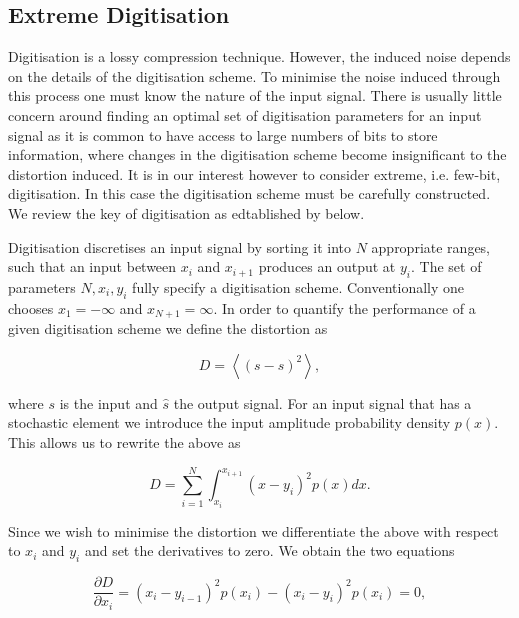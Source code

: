 \documentclass[apj]{emulateapj}
\begin{document}
\subsection{Extreme Digitisation}
\label{subsec:extremedigitisation}

Digitisation is a lossy compression technique. However, the induced noise depends on the details of the digitisation scheme. To minimise the noise induced through this process one must know the nature of the input signal. There is usually little concern around finding an optimal set of digitisation parameters for an input signal as it is common to have access to large numbers of bits to store information, where changes in the digitisation scheme become insignificant to the distortion induced. It is in our interest however to consider extreme, i.e. few-bit, digitisation. In this case the digitisation scheme must be carefully constructed. We review the key of digitisation as edtablished by \cite{max1960} below.

Digitisation discretises an input signal by sorting it into $N$ appropriate ranges, such that an input between $x_i$ and $x_{i+1}$ produces an output at $y_i$. The set of parameters $N, x_i, y_i$ fully specify a digitisation scheme. Conventionally one chooses $x_{1} = -\infty$ and $x_{N+1} = \infty$. In order to quantify the performance of a given digitisation scheme we define the distortion as

\begin{equation} D = \left\langle  \left( s - \hat{s} \right)^2 \right\rangle, \end{equation}

where $s$ is the input and $\hat{s}$ the output signal. For an input signal that has a stochastic element we introduce the input amplitude probability density $p(x)$. This allows us to rewrite the above as

\begin{equation} D = \sum_{i = 1}^N \int_{x_i}^{x_{i+1}} \left(x-y_i\right)^2 p(x) dx. \end{equation}

Since we wish to minimise the distortion we differentiate the above with respect to $x_i$ and $y_i$ and set the derivatives to zero. We obtain the two equations

\begin{equation} \label{eq:distderiv1}
\frac{\partial D}{\partial x_i} = \left(x_i-y_{i-1}\right)^2 p(x_i) - \left(x_i - y_i\right)^2 p(x_i) = 0,
\end{equation}
\end{document}
